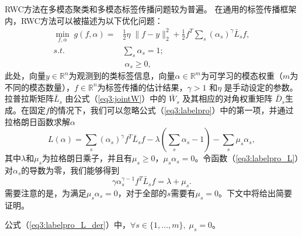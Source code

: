 RWC方法在多模态聚类和多模态标签传播问题较为普遍\cite{wang2009unified,xu2016discriminatively,xu2014multi}。 在通用的标签传播框架内，RWC方法可以被描述为以下优化问题：
\begin{equation}
\begin{split}
\mathop{\mathrm{min}}_{{f},{\alpha}}\;g({f},{\alpha})=&\frac{1}{2}\eta\; \|{f}-{y}\|^2_2+\frac{1}{2}{f}^T \sum_s(\alpha_s)^\gamma{\bar{{L}}}_s{f}, \\
s.t. \quad&\sum_s \alpha_s = 1;\\
&\;\alpha_s \ge 0,
\end{split}
\label{eq3:labelpro}
\end{equation}
此处，向量$ {y} \in  \mathbb{R}^{n} $为观测到的类标签信息，向量$ {\alpha} \in  \mathbb{R}^m$为可学习的模态权重（$m$为不同的模态数量），$ {f} \in  \mathbb{R}^{n}$为标签传播的估计结果，$ \gamma > 1$ 和$ \eta $ 是手动设定的参数。拉普拉斯矩阵$ \bar{{L}}_s $ 由公式（\ref{eq3:jointW}）中的 $ \bar{{W}}_s $  及其相应的对角权重矩阵 $ \bar{{D}}_s $生成。在固定$f$的情况下，我们可以忽略公式（\ref{eq3:labelpro}）中的第一项，并通过拉格朗日函数求解$ {\alpha} $
\begin{equation}
L({\alpha})=\sum_s(\alpha_s)^\gamma{f}^T {\bar{{L}}}_s{f} - \lambda ( \sum_s \alpha_s - 1)-\sum_s \mu_s \alpha_s,
\label{eq3:labelpro_L}
\end{equation}
其中$\lambda$和$\mu_s$为拉格朗日乘子，并且有$ \mu_s \ge 0$，$ \mu_s\alpha_s=0$。令函数（\ref{eq3:labelpro_L}）对$ \alpha_s $的导数为零，我们能够得到
\begin{equation}
\gamma \alpha_s^{\gamma-1}{f}^T {\bar{{L}}}_s{f} =\lambda + \mu_s.
\label{eq3:labelpro_L_der}
\end{equation}
需要注意的是，为满足$ \mu_s\alpha_s=0 $，对于全部的$s$需要有$\mu_s=0 $。下文中将给出简要证明。

\begin{proposition}
   \label{thm3} 
    公式（\ref{eq3:labelpro_L_der}）中，$\forall s \in \{1,\dots,m\}, \; \mu_s=0$。
\end{proposition}


